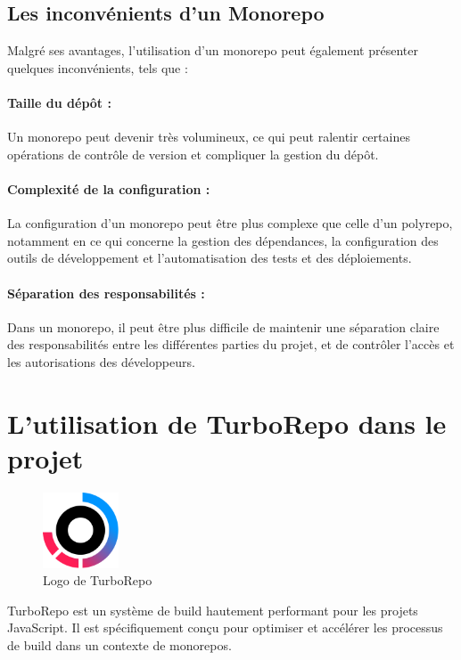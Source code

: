 \subsection{Les inconvénients d'un Monorepo}

Malgré ses avantages, l'utilisation d'un monorepo peut également présenter quelques inconvénients, tels que :

\paragraph{Taille du dépôt :} Un monorepo peut devenir très volumineux, ce qui peut ralentir certaines opérations de contrôle de version et compliquer la gestion du dépôt.
\paragraph{Complexité de la configuration :} La configuration d'un monorepo peut être plus complexe que celle d'un polyrepo, notamment en ce qui concerne la gestion des dépendances, la configuration des outils de développement et l'automatisation des tests et des déploiements.
\paragraph{Séparation des responsabilités :} Dans un monorepo, il peut être plus difficile de maintenir une séparation claire des responsabilités entre les différentes parties du projet, et de contrôler l'accès et les autorisations des développeurs.

\section{L'utilisation de TurboRepo dans le projet}

\begin{figure}
    \centering
    \includegraphics[width=0.2\textwidth]{assets/figures/turborepo.png}
    \caption{Logo de TurboRepo}
    \label{fig:turborepo}
\end{figure}

TurboRepo\cite{Turborepo} est un système de build hautement performant pour les projets JavaScript. Il est spécifiquement conçu pour optimiser et accélérer les processus de build dans un contexte de monorepos.

